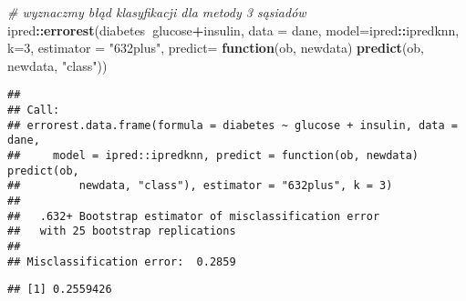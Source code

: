 \documentclass[polish,]{book}
\newenvironment{Shaded}{\begin{snugshade}}{\end{snugshade}}
\newcommand{\CommentTok}[1]{\textcolor[rgb]{0.56,0.35,0.01}{\textit{#1}}}
\newcommand{\ControlFlowTok}[1]{\textcolor[rgb]{0.13,0.29,0.53}{\textbf{#1}}}
\newcommand{\DataTypeTok}[1]{\textcolor[rgb]{0.13,0.29,0.53}{#1}}
\newcommand{\DecValTok}[1]{\textcolor[rgb]{0.00,0.00,0.81}{#1}}
\newcommand{\KeywordTok}[1]{\textcolor[rgb]{0.13,0.29,0.53}{\textbf{#1}}}
\newcommand{\NormalTok}[1]{#1}
\newcommand{\OperatorTok}[1]{\textcolor[rgb]{0.81,0.36,0.00}{\textbf{#1}}}
\newcommand{\StringTok}[1]{\textcolor[rgb]{0.31,0.60,0.02}{#1}}
\begin{document}
\begin{Shaded}
\begin{Highlighting}[]
\CommentTok{# wyznaczmy błąd klasyfikacji dla metody 3 sąsiadów}
\NormalTok{ipred}\OperatorTok{::}\KeywordTok{errorest}\NormalTok{(diabetes}\OperatorTok{~}\NormalTok{glucose}\OperatorTok{+}\NormalTok{insulin, }\DataTypeTok{data =}\NormalTok{ dane, }\DataTypeTok{model=}\NormalTok{ipred}\OperatorTok{::}\NormalTok{ipredknn, }\DataTypeTok{k=}\DecValTok{3}\NormalTok{,}
                \DataTypeTok{estimator =} \StringTok{"632plus"}\NormalTok{,}
                \DataTypeTok{predict=} \ControlFlowTok{function}\NormalTok{(ob, newdata) }\KeywordTok{predict}\NormalTok{(ob, newdata, }\StringTok{"class"}\NormalTok{))}
\end{Highlighting}
\end{Shaded}

\begin{verbatim}
## 
## Call:
## errorest.data.frame(formula = diabetes ~ glucose + insulin, data = dane, 
##     model = ipred::ipredknn, predict = function(ob, newdata) predict(ob, 
##         newdata, "class"), estimator = "632plus", k = 3)
## 
##   .632+ Bootstrap estimator of misclassification error 
##   with 25 bootstrap replications
## 
## Misclassification error:  0.2859
\end{verbatim}

\begin{Shaded}
\end{Shaded}

\begin{verbatim}
## [1] 0.2559426
\end{verbatim}
\end{document}

